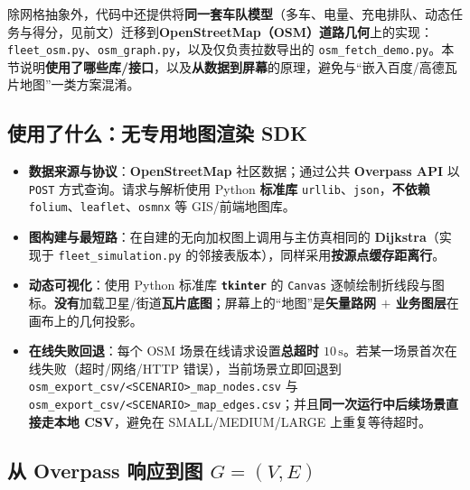 \documentclass[UTF8,a4paper]{ctexart}
\begin{document}
除网格抽象外，代码中还提供将\textbf{同一套车队模型}（多车、电量、充电排队、动态任务与得分，见前文）迁移到\textbf{OpenStreetMap（OSM）道路几何}上的实现：\texttt{fleet\_osm.py}、\texttt{osm\_graph.py}，以及仅负责拉数导出的 \texttt{osm\_fetch\_demo.py}。本节说明\textbf{使用了哪些库/接口}，以及\textbf{从数据到屏幕}的原理，避免与“嵌入百度/高德瓦片地图”一类方案混淆。

\subsection{使用了什么：无专用地图渲染 SDK}

\begin{itemize}
  \item \textbf{数据来源与协议}：\textbf{OpenStreetMap} 社区数据；通过公共 \textbf{Overpass API} 以 \texttt{POST} 方式查询。请求与解析使用 Python \textbf{标准库} \texttt{urllib}、\texttt{json}，\textbf{不依赖} \texttt{folium}、\texttt{leaflet}、\texttt{osmnx} 等 GIS/前端地图库。
  \item \textbf{图构建与最短路}：在自建的无向加权图上调用与主仿真相同的 \textbf{Dijkstra}（实现于 \texttt{fleet\_simulation.py} 的邻接表版本），同样采用\textbf{按源点缓存距离行}。
  \item \textbf{动态可视化}：使用 Python 标准库 \textbf{\texttt{tkinter}} 的 \texttt{Canvas} 逐帧绘制折线段与图标。\textbf{没有}加载卫星/街道\textbf{瓦片底图}；屏幕上的“地图”是\textbf{矢量路网 $+$ 业务图层}在画布上的几何投影。
  \item \textbf{在线失败回退}：每个 OSM 场景在线请求设置\textbf{总超时 $10\,\mathrm{s}$}。若某一场景首次在线失败（超时/网络/HTTP 错误），当前场景立即回退到 \texttt{osm\_export\_csv/<SCENARIO>\_map\_nodes.csv} 与 \texttt{osm\_export\_csv/<SCENARIO>\_map\_edges.csv}；并且\textbf{同一次运行中后续场景直接走本地 CSV}，避免在 SMALL/MEDIUM/LARGE 上重复等待超时。
\end{itemize}

\subsection[从 Overpass 到路网图]{从 Overpass 响应到图 $G=(V,E)$}
\end{document}
